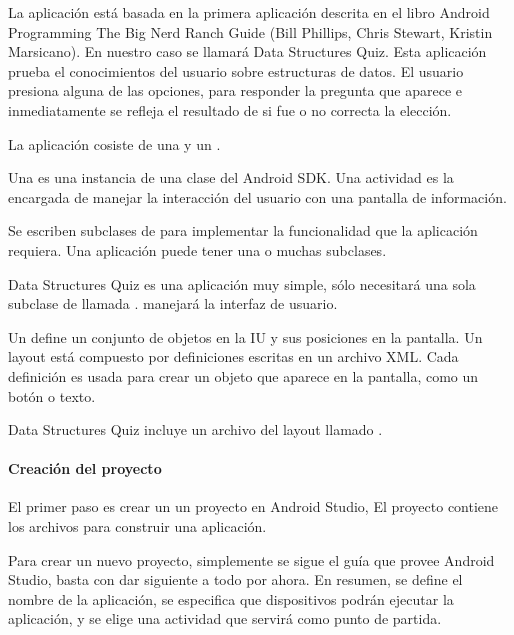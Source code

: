 La aplicación está basada en la primera aplicación descrita en el libro Android
Programming The Big Nerd Ranch Guide (Bill Phillips, Chris Stewart, Kristin Marsicano).
En nuestro caso se llamará Data Structures Quiz. Esta aplicación prueba el
conocimientos del usuario sobre estructuras de datos. El usuario presiona
alguna de las opciones, para responder la pregunta que aparece e inmediatamente
se refleja el resultado de si fue o no correcta la elección.

La aplicación cosiste de una  y un .

Una  es una instancia de  una clase del Android SDK.
Una actividad es la encargada de manejar la interacción del usuario con una
pantalla de información.

Se escriben subclases de  para implementar la funcionalidad que la
aplicación requiera. Una aplicación puede tener una o muchas subclases.

Data Structures Quiz es una aplicación muy simple, sólo necesitará una sola
subclase de  llamada .  manejará la
interfaz de usuario.

Un  define un conjunto de objetos en la IU y sus posiciones en la
pantalla. Un layout está compuesto por definiciones escritas en un archivo
XML. Cada definición es usada para crear un objeto que aparece en la pantalla,
como un botón o texto.

Data Structures Quiz incluye un archivo del layout llamado .


\paragraph{Creación del proyecto}
\label{\detokenize{dev_docs:creacion-del-proyecto}}
El primer paso es crear un un proyecto en Android Studio, El proyecto contiene
los archivos para construir una aplicación.

Para crear un nuevo proyecto, simplemente se sigue el guía que provee Android
Studio, basta con dar siguiente a todo por ahora.
En resumen, se define el nombre
de la aplicación, se especifica que dispositivos podrán ejecutar la aplicación,
y se elige una actividad que servirá como punto de partida.


